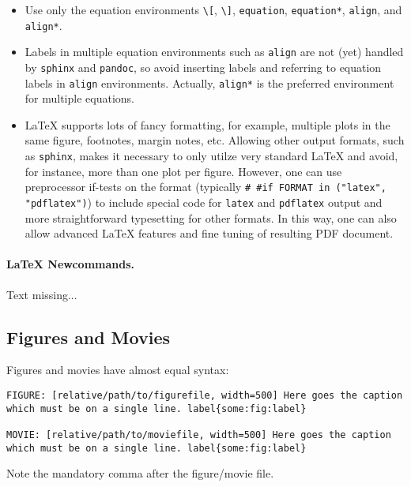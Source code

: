 \documentclass[twoside]{article}
\begin{document}
\begin{itemize}
  \item Use only the equation environments {\fontsize{10pt}{10pt}\verb!\[!}, {\fontsize{10pt}{10pt}\verb!\]!},
    {\fontsize{10pt}{10pt}\verb!equation!}, {\fontsize{10pt}{10pt}\verb!equation*!}, {\fontsize{10pt}{10pt}\verb!align!}, and {\fontsize{10pt}{10pt}\verb!align*!}.

  \item Labels in multiple equation environments such as {\fontsize{10pt}{10pt}\verb!align!} are
    not (yet) handled by {\fontsize{10pt}{10pt}\verb!sphinx!} and {\fontsize{10pt}{10pt}\verb!pandoc!}, so avoid inserting
    labels and referring  to equation labels in {\fontsize{10pt}{10pt}\verb!align!} environments.
    Actually, {\fontsize{10pt}{10pt}\verb!align*!} is the preferred environment for multiple equations.

  \item {\LaTeX} supports lots of fancy formatting, for example, multiple
    plots in the same figure, footnotes, margin notes, etc.
    Allowing other output formats, such as {\fontsize{10pt}{10pt}\verb!sphinx!}, makes it necessary
    to only utilze very standard {\LaTeX} and avoid, for instance, more than
    one plot per figure. However, one can use preprocessor if-tests on
    the format (typically {\fontsize{10pt}{10pt}\verb!# #if FORMAT in ("latex", "pdflatex")!}) to
    include special code for {\fontsize{10pt}{10pt}\verb!latex!} and {\fontsize{10pt}{10pt}\verb!pdflatex!} output and more
    straightforward typesetting for other formats. In this way, one can
    also allow advanced {\LaTeX} features and fine tuning of resulting
    PDF document.
\end{itemize}

\noindent
\paragraph{LaTeX Newcommands.}
Text missing...

\subsection{Figures and Movies}

Figures and movies have almost equal syntax:
\begin{Verbatim}
FIGURE: [relative/path/to/figurefile, width=500] Here goes the caption which must be on a single line. label{some:fig:label}

MOVIE: [relative/path/to/moviefile, width=500] Here goes the caption which must be on a single line. label{some:fig:label}
\end{Verbatim}
Note the mandatory comma after the figure/movie file.
\end{document}
